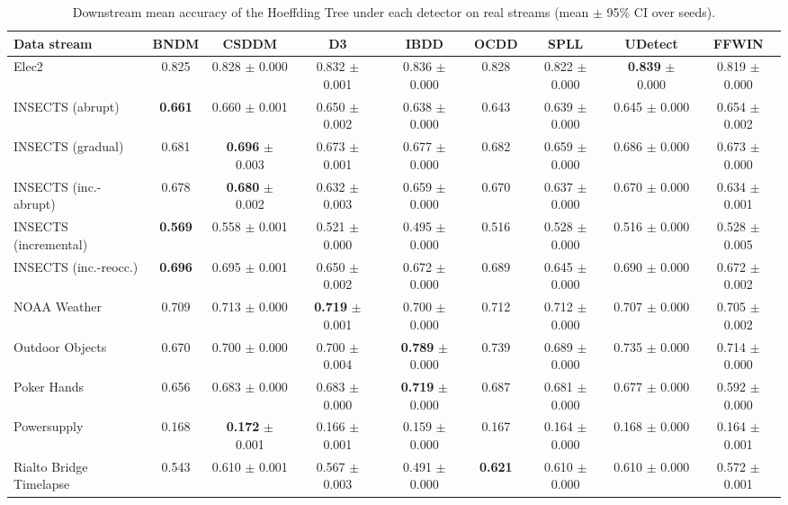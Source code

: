 \begin{table}[!t]
\centering
\caption{Downstream mean accuracy of the Hoeffding Tree under each detector on real streams (mean $\pm$ 95\% CI over seeds).}
\label{tab:acc_ht_detectors}
\footnotesize
\setlength{\tabcolsep}{4pt}
\begin{tabular}{@{}lcccccccc@{}}
\toprule
\textbf{Data stream} & \textbf{BNDM} & \textbf{CSDDM} & \textbf{D3} & \textbf{IBDD} & \textbf{OCDD} & \textbf{SPLL} & \textbf{UDetect} & \textbf{FFWIN} \\
\midrule
Elec2 & 0.825 & 0.828 $\pm$ 0.000 & 0.832 $\pm$ 0.001 & 0.836 $\pm$ 0.000 & 0.828 & 0.822 $\pm$ 0.000 & \textbf{0.839} $\pm$ 0.000 & 0.819 $\pm$ 0.000 \\
INSECTS (abrupt) & \textbf{0.661} & 0.660 $\pm$ 0.001 & 0.650 $\pm$ 0.002 & 0.638 $\pm$ 0.000 & 0.643 & 0.639 $\pm$ 0.000 & 0.645 $\pm$ 0.000 & 0.654 $\pm$ 0.002 \\
INSECTS (gradual) & 0.681 & \textbf{0.696} $\pm$ 0.003 & 0.673 $\pm$ 0.001 & 0.677 $\pm$ 0.000 & 0.682 & 0.659 $\pm$ 0.000 & 0.686 $\pm$ 0.000 & 0.673 $\pm$ 0.000 \\
INSECTS (inc.-abrupt) & 0.678 & \textbf{0.680} $\pm$ 0.002 & 0.632 $\pm$ 0.003 & 0.659 $\pm$ 0.000 & 0.670 & 0.637 $\pm$ 0.000 & 0.670 $\pm$ 0.000 & 0.634 $\pm$ 0.001 \\
INSECTS (incremental) & \textbf{0.569} & 0.558 $\pm$ 0.001 & 0.521 $\pm$ 0.000 & 0.495 $\pm$ 0.000 & 0.516 & 0.528 $\pm$ 0.000 & 0.516 $\pm$ 0.000 & 0.528 $\pm$ 0.005 \\
INSECTS (inc.-reocc.) & \textbf{0.696} & 0.695 $\pm$ 0.001 & 0.650 $\pm$ 0.002 & 0.672 $\pm$ 0.000 & 0.689 & 0.645 $\pm$ 0.000 & 0.690 $\pm$ 0.000 & 0.672 $\pm$ 0.002 \\
NOAA Weather & 0.709 & 0.713 $\pm$ 0.000 & \textbf{0.719} $\pm$ 0.001 & 0.700 $\pm$ 0.000 & 0.712 & 0.712 $\pm$ 0.000 & 0.707 $\pm$ 0.000 & 0.705 $\pm$ 0.002 \\
Outdoor Objects & 0.670 & 0.700 $\pm$ 0.000 & 0.700 $\pm$ 0.004 & \textbf{0.789} $\pm$ 0.000 & 0.739 & 0.689 $\pm$ 0.000 & 0.735 $\pm$ 0.000 & 0.714 $\pm$ 0.000 \\
Poker Hands & 0.656 & 0.683 $\pm$ 0.000 & 0.683 $\pm$ 0.000 & \textbf{0.719} $\pm$ 0.000 & 0.687 & 0.681 $\pm$ 0.000 & 0.677 $\pm$ 0.000 & 0.592 $\pm$ 0.000 \\
Powersupply & 0.168 & \textbf{0.172} $\pm$ 0.001 & 0.166 $\pm$ 0.001 & 0.159 $\pm$ 0.000 & 0.167 & 0.164 $\pm$ 0.000 & 0.168 $\pm$ 0.000 & 0.164 $\pm$ 0.001 \\
Rialto Bridge Timelapse & 0.543 & 0.610 $\pm$ 0.001 & 0.567 $\pm$ 0.003 & 0.491 $\pm$ 0.000 & \textbf{0.621} & 0.610 $\pm$ 0.000 & 0.610 $\pm$ 0.000 & 0.572 $\pm$ 0.001 \\
\bottomrule
\end{tabular}
\end{table}
